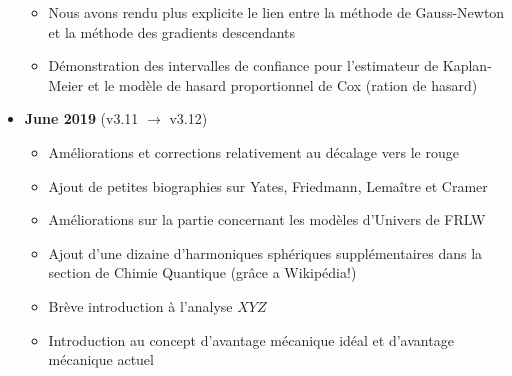 \begin{itemize}
\begin{itemize}[noitemsep]
				\item Nous avons rendu plus explicite le lien entre la méthode de Gauss-Newton et la méthode des gradients descendants
				\item Démonstration des intervalles de confiance pour l'estimateur de Kaplan-Meier et le modèle de hasard proportionnel de Cox (ration de hasard)
		\end{itemize}
		\item \textbf{June 2019} (v3.11 $\rightarrow$ v3.12)
			\begin{itemize}[noitemsep]
				\item Améliorations et corrections relativement au décalage vers le rouge
				\item Ajout de petites biographies sur Yates, Friedmann, Lemaître et Cramer
				\item Améliorations sur la partie concernant les modèles d'Univers de FRLW
				\item Ajout d'une dizaine d'harmoniques sphériques supplémentaires dans la section de Chimie Quantique (grâce a Wikipédia!)
				\item Brève introduction à l'analyse $XYZ$
				\item Introduction au concept d'avantage mécanique idéal et d'avantage mécanique actuel
		\end{itemize}
	\end{itemize}
